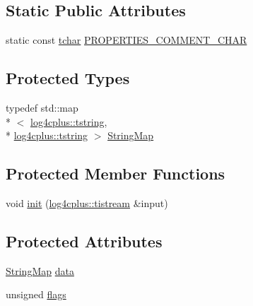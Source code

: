 \subsection*{Static Public Attributes}
\begin{DoxyCompactItemize}
\item 
static const \hyperlink{namespacelog4cplus_a7b80b5711ae9e7a1ddd97dbaefbe3583}{tchar} \hyperlink{classlog4cplus_1_1helpers_1_1Properties_ad8750ca144fb7997867bf4d707993ba8}{P\-R\-O\-P\-E\-R\-T\-I\-E\-S\-\_\-\-C\-O\-M\-M\-E\-N\-T\-\_\-\-C\-H\-A\-R}
\end{DoxyCompactItemize}
\subsection*{Protected Types}
\begin{DoxyCompactItemize}
\item 
typedef std\-::map\\*
$<$ \hyperlink{namespacelog4cplus_a3c9287f6ebcddc50355e29d71152117b}{log4cplus\-::tstring}, \\*
\hyperlink{namespacelog4cplus_a3c9287f6ebcddc50355e29d71152117b}{log4cplus\-::tstring} $>$ \hyperlink{classlog4cplus_1_1helpers_1_1Properties_a2e9fc9f64f8bc7de9f22021aedd25f1d}{String\-Map}
\end{DoxyCompactItemize}
\subsection*{Protected Member Functions}
\begin{DoxyCompactItemize}
\item 
void \hyperlink{classlog4cplus_1_1helpers_1_1Properties_aaab0a3cc31361a8fc0fb08bfa9cb3dcf}{init} (\hyperlink{namespacelog4cplus_aa09fa8d7ec3f48e80ed15d5a1dbc38a7}{log4cplus\-::tistream} \&input)
\end{DoxyCompactItemize}
\subsection*{Protected Attributes}
\begin{DoxyCompactItemize}
\item 
\hyperlink{classlog4cplus_1_1helpers_1_1Properties_a2e9fc9f64f8bc7de9f22021aedd25f1d}{String\-Map} \hyperlink{classlog4cplus_1_1helpers_1_1Properties_a60cbb0e1ff347173db23c27d541da0b8}{data}
\item 
unsigned \hyperlink{classlog4cplus_1_1helpers_1_1Properties_a421e8c2c017bceb1f21d3811a9839b00}{flags}
\end{DoxyCompactItemize}


